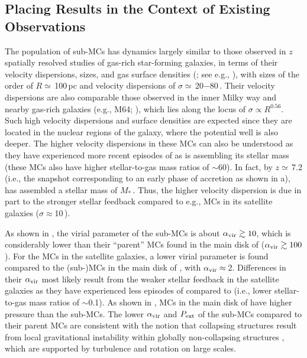 \IfFileExists{emulateapjlegacy.cls}{\documentclass[iop]{emulateapjlegacy}}{\documentclass[iop]{emulateapj}}
\begin{document}
\subsection{Placing Results in the Context of Existing Observations} \label{sec:diss1}
The population of sub-MCs has dynamics largely
similar to those observed
in $z$ spatially resolved studies of gas-rich star-forming galaxies, in
terms of their velocity dispersions, sizes, and gas surface densities (; see
e.g., \citealt{Swinbank11a}), with sizes of the order of $R\simeq$\,100\,pc and velocity
dispersions of $\sigma\simeq$\,20$-$80\,\kms.
Their velocity dispersions are also comparable those observed in the inner Milky way and
nearby gas-rich galaxies (e.g., M64; \citealt{Oka01a, Rosolowsky05a, Heyer09a}), which lies
along the locus of $\sigma\propto R^{0.56}$.
Such high velocity dispersions and surface densities are expected since
they are located in the nuclear regions of the
galaxy, where the potential well is also deeper. The higher velocity dispersions
in these MCs can also be understood as they have experienced more recent episodes
of \SF as \flower is assembling its stellar mass (these MCs also have higher stellar-to-gas mass ratios of $\sim$60).
In fact, by $z\simeq$\,7.2 (i.e., the snapshot corresponding to an early phase of accretion as
shown in a), \flower has assembled
a stellar mass of $M_*$\,\Msun. Thus, the higher velocity dispersion
is due in part to the stronger stellar feedback compared to e.g., MCs in its satellite galaxies ($\sigma\approx$10\,\kms).

As shown in , the virial parameter of the sub-MCs is about $\alpha_{\rm vir}\gtrsim10$, which 
is considerably lower than their ``parent'' MCs found in the main disk of \flower ($\alpha_{\rm vir}\gtrsim100$).
For the MCs in the satellite galaxies, a lower virial parameter is found 
compared to the (sub-)MCs in the main disk of \flower, with $\alpha_{\rm vir}\approx$\,2.
Differences in their $\alpha_{\rm vir}$ most likely result from the weaker
stellar feedback in the satellite galaxies as they have experienced less episodes of \SF compared to
\flower (i.e., lower stellar-to-gas mass ratios of $\sim$0.1).
As shown in , MCs in the main disk of \flower have higher pressure than the sub-MCs.
The lower $\alpha_{\rm vir}$ and $P_{\rm ext}$ of the sub-MCs
compared to their parent MCs are consistent with
the notion that collapsing structures result from local gravitational
instability within globally non-collapsing structures \citep[see e.g.,][]{Ballesteros-Paredes11a},
which are supported by turbulence and rotation on large scales.
\end{document}
